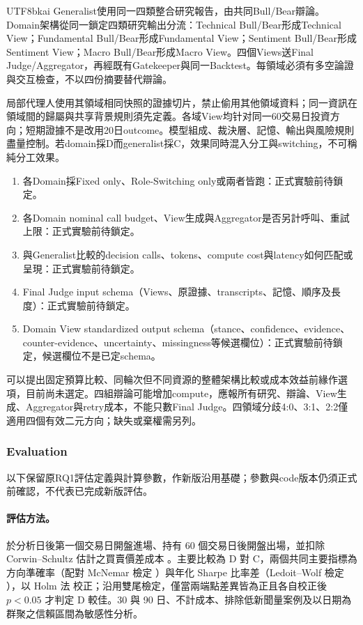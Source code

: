 \documentclass[12pt,a4paper]{article}
\newcommand{\grp}[1]{\textsf{#1}}
\begin{document}
\begin{CJK}{UTF8}{bkai}
Generalist使用同一四類整合研究報告，由共同Bull/Bear辯論。Domain架構從同一鎖定四類研究輸出分流：Technical Bull/Bear形成Technical View；Fundamental Bull/Bear形成Fundamental View；Sentiment Bull/Bear形成Sentiment View；Macro Bull/Bear形成Macro View。四個Views送Final Judge/Aggregator，再經既有Gatekeeper與同一Backtest。每領域必須有多空論證與交互檢查，不以四份摘要替代辯論。

局部代理人使用其領域相同快照的證據切片，禁止偷用其他領域資料；同一資訊在領域間的歸屬與共享背景規則須先定義。各域View均针对同一60交易日投資方向；短期證據不是改用20日outcome。模型組成、裁決層、記憶、輸出與風險規則盡量控制。若domain採D而generalist採C，效果同時混入分工與switching，不可稱純分工效果。

\begin{enumerate}
\item 各Domain採Fixed only、Role-Switching only或兩者皆跑：正式實驗前待鎖定。
\item 各Domain nominal call budget、View生成與Aggregator是否另計呼叫、重試上限：正式實驗前待鎖定。
\item 與Generalist比較的decision calls、tokens、compute cost與latency如何匹配或呈現：正式實驗前待鎖定。
\item Final Judge input schema（Views、原證據、transcripts、記憶、順序及長度）：正式實驗前待鎖定。
\item Domain View standardized output schema（stance、confidence、evidence、counter-evidence、uncertainty、missingness等候選欄位）：正式實驗前待鎖定，候選欄位不是已定schema。
\end{enumerate}
可以提出固定預算比較、同輪次但不同資源的整體架構比較或成本效益前緣作選項，目前尚未選定。四組辯論可能增加compute，應報所有研究、辯論、View生成、Aggregator與retry成本，不能只數Final Judge。四領域分歧4:0、3:1、2:2僅適用四個有效二元方向；缺失或棄權需另列。

\subsubsection{Evaluation}
以下保留原RQ1評估定義與計算參數，作新版沿用基礎；參數與code版本仍須正式前確認，不代表已完成新版評估。
\paragraph{評估方法。} 於分析日後第一個交易日開盤進場、持有 60 個交易日後開盤出場，並扣除 Corwin--Schultz 估計之買賣價差成本 \citep{corwin2012spread}。主要比較為 \grp{D} 對 \grp{C}，兩個共同主要指標為方向準確率（配對 McNemar 檢定 \citep{mcnemar1947}）與年化 Sharpe 比率差（Ledoit--Wolf 檢定 \citep{ledoit2008sharpe}），以 Holm 法 \citep{holm1979} 校正；沿用雙尾檢定，僅當兩端點差異皆為正且各自校正後 $p<0.05$ 才判定 \grp{D} 較佳。30 與 90 日、不計成本、排除低新聞量案例及以日期為群聚之信賴區間為敏感性分析。


\end{CJK}
\end{document}
